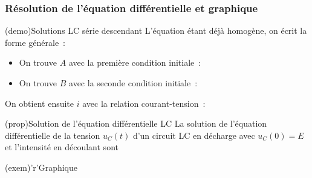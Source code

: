 \documentclass[../../main/main.tex]{subfiles}
\begin{document}
\subsubsection{Résolution de l'équation différentielle et graphique}
\begin{tcb}[label=demo:rcsolu](demo){Solutions LC série descendant}
	L'équation étant déjà homogène, on écrit la forme générale~:
	\psw{
		\[
			u_C(t) = A\cos(\w_0 t) + B\sin(\w_0 t)
		\]
	}
	\vspace{-15pt}
	\begin{itemize}
		\item On trouve $A$ avec la première condition initiale~:
		      \psw{
			      \[
				      u_C(0) = A\cos(0) + B\sin(0) = A
				      \qet
				      u_C(0) = E
				      \quad \Ra \boxed{A = E}
			      \]
		      }
		      \vspace{-15pt}
		\item On trouve $B$ avec la seconde condition initiale~:
		      \vspace{-15pt}
	\end{itemize}
	On obtient ensuite $i$ avec la relation courant-tension~:
	\psw{
		\[
			i(t) = C \dv{u_c}{t} = -CE \w_0 \sin(\w_0t)
		\]
	}
	\vspace{-15pt}
\end{tcb}
\begin{tcbraster}[raster columns=2, raster equal height=rows]
	\begin{tcb}[label=prop:ucsolu](prop){Solution de l'équation
				différentielle LC}
		La solution de l'équation différentielle de la tension $u_C(t)$
		d'un circuit LC en décharge avec $u_C(0) = E$ et l'intensité en
		découlant sont
	\end{tcb}
	\begin{tcb}[width=\linewidth](exem)'r'{Graphique}
		\begin{center}
		\end{center}
	\end{tcb}
\end{tcbraster}
\end{document}
